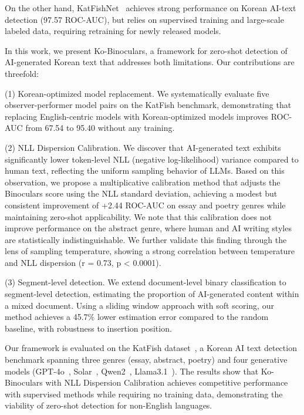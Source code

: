 \documentclass{article}
\begin{document}
On the other hand, KatFishNet~\cite{park2025katfishnet} achieves strong performance on Korean AI-text detection (97.57 ROC-AUC), but relies on supervised training and large-scale labeled data, requiring retraining for newly released models.

In this work, we present Ko-Binoculars, a framework for zero-shot detection of AI-generated Korean text that addresses both limitations. Our contributions are threefold:

(1) Korean-optimized model replacement. We systematically evaluate five observer-performer model pairs on the KatFish benchmark, demonstrating that replacing English-centric models with Korean-optimized models improves ROC-AUC from 67.54 to 95.40 without any training.

(2) NLL Dispersion Calibration. We discover that AI-generated text exhibits significantly lower token-level NLL (negative log-likelihood) variance compared to human text, reflecting the uniform sampling behavior of LLMs. Based on this observation, we propose a multiplicative calibration method that adjusts the Binoculars score using the NLL standard deviation, achieving a modest but consistent improvement of +2.44 ROC-AUC on essay and poetry genres while maintaining zero-shot applicability. We note that this calibration does not improve performance on the abstract genre, where human and AI writing styles are statistically indistinguishable. We further validate this finding through the lens of sampling temperature, showing a strong correlation between temperature and NLL dispersion (r = 0.73, p < 0.0001).

(3) Segment-level detection. We extend document-level binary classification to segment-level detection, estimating the proportion of AI-generated content within a mixed document. Using a sliding window approach with soft scoring, our method achieves a 45.7\% lower estimation error compared to the random baseline, with robustness to insertion position.

Our framework is evaluated on the KatFish dataset~\cite{park2025katfishnet}, a Korean AI text detection benchmark spanning three genres (essay, abstract, poetry) and four generative models (GPT-4o~\cite{openai2024gpt4o}, Solar~\cite{kim2024solar}, Qwen2~\cite{yang2024qwen2}, Llama3.1~\cite{dubey2024llama}). The results show that Ko-Binoculars with NLL Dispersion Calibration achieves competitive performance with supervised methods while requiring no training data, demonstrating the viability of zero-shot detection for non-English languages.
\end{document}
